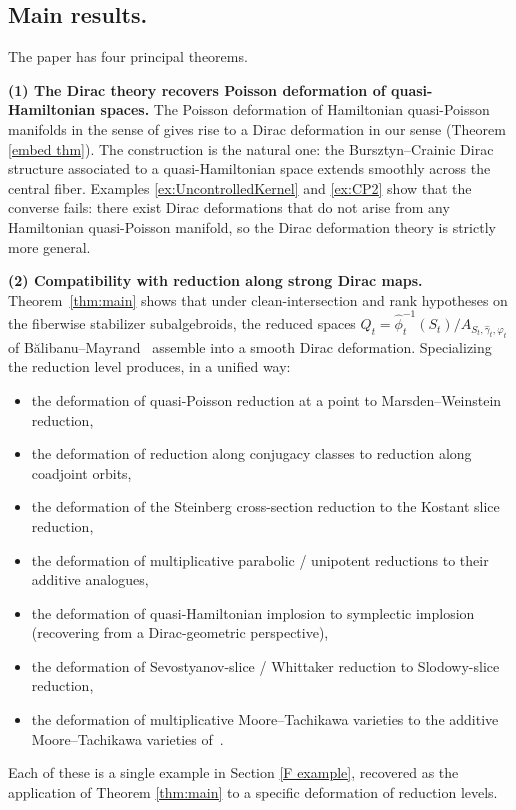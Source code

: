\documentclass[reqno]{amsart}
\theoremstyle{plain}
\theoremstyle{definition}
\begin{document}
\subsection*{Main results.}
The paper has four principal theorems.
 
\smallskip
\noindent\textbf{(1) The Dirac theory recovers Poisson deformation of quasi-Hamiltonian spaces.}
The Poisson deformation of Hamiltonian quasi-Poisson manifolds in the sense of \cite{maiza2026multiplicative}
gives rise to a Dirac deformation in our sense (Theorem \ref{embed thm}). The construction
is the natural one: the Bursztyn--Crainic Dirac structure associated to a quasi-Hamiltonian space
extends smoothly across the central fiber. Examples \ref{ex:UncontrolledKernel}
and \ref{ex:CP2} show that the converse fails: there exist Dirac deformations that do not arise
from any Hamiltonian quasi-Poisson manifold, so the Dirac deformation theory is strictly more general.
 
\smallskip
\noindent\textbf{(2) Compatibility with reduction along strong Dirac maps.}
Theorem~\ref{thm:main} shows that under clean-intersection and rank hypotheses on the fiberwise stabilizer subalgebroids, the reduced spaces $Q_t=\widehat{\phi}_t^{-1}(S_t)/A_{S_t,\widehat{\gamma}_t,\varphi_t}$
of B\u{a}libanu--Mayrand~\cite[Theorem 2.21]{bualibanu2026reduction} assemble into a smooth Dirac deformation.
Specializing the reduction level produces, in a unified way:
\begin{itemize}
\item the deformation of quasi-Poisson reduction at a point to Marsden--Weinstein reduction,
\item the deformation of reduction along conjugacy classes to reduction along coadjoint orbits,
\item the deformation of the Steinberg cross-section reduction to the Kostant slice reduction,
\item the deformation of multiplicative parabolic / unipotent reductions to their additive analogues,
\item the deformation of quasi-Hamiltonian implosion to symplectic implosion (recovering \cite[Theorem 5.3]{maiza2026multiplicative} from a Dirac-geometric perspective),
\item the deformation of Sevostyanov-slice / Whittaker reduction to Slodowy-slice reduction,
\item the deformation of multiplicative Moore--Tachikawa varieties to the additive
Moore--Tachikawa varieties of~\cite{crooks2024moore}.
\end{itemize}
Each of these is a single example in Section \ref{F example}, recovered as the application
of Theorem \ref{thm:main} to a specific deformation of reduction levels.
 
\end{document}
